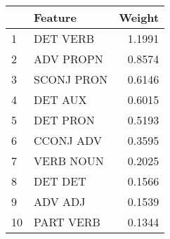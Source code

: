 \begin{tabular}{llr}
\toprule
{} &     Feature &  Weight \\
\midrule
1  &    DET VERB &  1.1991 \\
2  &   ADV PROPN &  0.8574 \\
3  &  SCONJ PRON &  0.6146 \\
4  &     DET AUX &  0.6015 \\
5  &    DET PRON &  0.5193 \\
6  &   CCONJ ADV &  0.3595 \\
7  &   VERB NOUN &  0.2025 \\
8  &     DET DET &  0.1566 \\
9  &     ADV ADJ &  0.1539 \\
10 &   PART VERB &  0.1344 \\
\bottomrule
\end{tabular}
